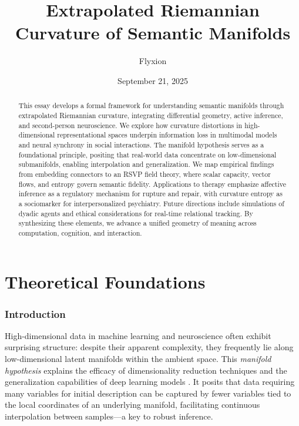 \documentclass{article}
\title{Extrapolated Riemannian Curvature of Semantic Manifolds}
\author{Flyxion}
\date{September 21, 2025}
\theoremstyle{definition}
\begin{document}
\maketitle

\begin{abstract}
This essay develops a formal framework for understanding semantic manifolds through extrapolated Riemannian curvature, integrating differential geometry, active inference, and second-person neuroscience. We explore how curvature distortions in high-dimensional representational spaces underpin information loss in multimodal models and neural synchrony in social interactions. The manifold hypothesis serves as a foundational principle, positing that real-world data concentrate on low-dimensional submanifolds, enabling interpolation and generalization. We map empirical findings from embedding connectors to an RSVP field theory, where scalar capacity, vector flows, and entropy govern semantic fidelity. Applications to therapy emphasize affective inference as a regulatory mechanism for rupture and repair, with curvature entropy as a sociomarker for interpersonalized psychiatry. Future directions include simulations of dyadic agents and ethical considerations for real-time relational tracking. By synthesizing these elements, we advance a unified geometry of meaning across computation, cognition, and interaction.
\end{abstract}

\tableofcontents

\part{Theoretical Foundations}

\section{Introduction}

High-dimensional data in machine learning and neuroscience often exhibit surprising structure: despite their apparent complexity, they frequently lie along low-dimensional latent manifolds within the ambient space. This \emph{manifold hypothesis} \citep{fefferman2016testing,gorban2018blessing,olah2014blog,cayton2005algorithms} explains the efficacy of dimensionality reduction techniques and the generalization capabilities of deep learning models \citep{chollet2021deep}. It posits that data requiring many variables for initial description can be captured by fewer variables tied to the local coordinates of an underlying manifold, facilitating continuous interpolation between samples—a key to robust inference.
\end{document}
